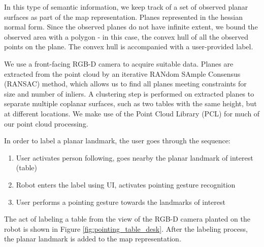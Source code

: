 \documentclass[12pt]{gatech-thesis}
\begin{document}
In this type of semantic information, we keep track of a set of observed planar surfaces as part of the map representation. Planes represented in the hessian normal form. Since the observed planes do not have infinite extent, we bound the observed area with a polygon - in this case, the convex hull of all the observed points on the plane. The convex hull is accompanied with a user-provided label. 

We use a front-facing RGB-D camera to acquire suitable data. Planes are extracted from the point cloud by an iterative RANdom SAmple Consensus (RANSAC) method, which allows us to find all planes meeting constraints for size and number of inliers. A clustering step is performed on extracted planes to separate multiple coplanar surfaces, such as two tables with
the same height, but at different locations. We make use of the Point Cloud Library (PCL) \cite{rusu20113d} for much of our point cloud processing.

In order to label a planar landmark, the user goes through the sequence:

\begin{enumerate}
\item User activates person following, goes nearby the planar landmark of interest (table)
\item Robot enters the label using UI, activates pointing gesture recognition
\item User performs a pointing gesture towards the landmarks of interest
\end{enumerate}

The act of labeling a table from the view of the RGB-D camera planted on the robot is shown in Figure \ref{fig:pointing_table_desk}. After the labeling process, the planar landmark is added to the map representation.
\end{document}
